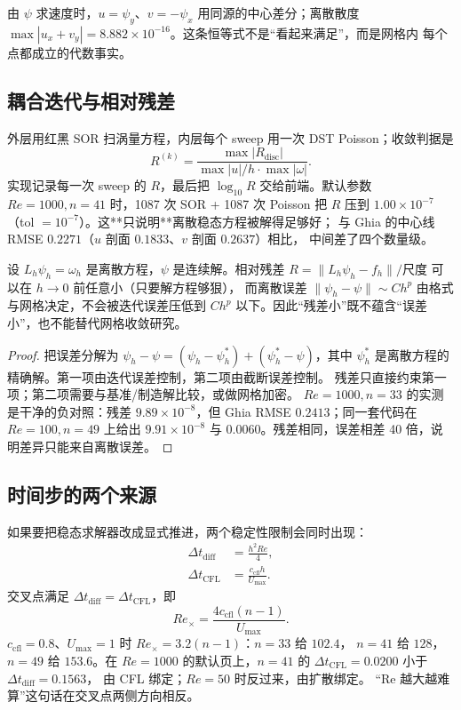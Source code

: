 由 $\psi$ 求速度时，$u=\psi_y$、$v=-\psi_x$ 用同源的中心差分；离散散度
$\max|u_x+v_y|=8.882\times10^{-16}$。这条恒等式不是“看起来满足”，而是网格内
每个点都成立的代数事实。

\subsection{耦合迭代与相对残差}

外层用红黑 SOR 扫涡量方程，内层每个 sweep 用一次 DST Poisson；收敛判据是
\[
  R^{(k)}=\frac{\max|R_{\text{disc}}|}
  {\max|u|/h\cdot\max|\omega|}.
\]
实现记录每一次 sweep 的 $R$，最后把 $\log_{10}R$ 交给前端。默认参数
$Re=1000,n=41$ 时，1087 次 SOR + 1087 次 Poisson 把 $R$ 压到
$1.00\times10^{-7}$（tol $=10^{-7}$）。这**只说明**离散稳态方程被解得足够好；
与 Ghia 的中心线 RMSE $0.2271$（$u$ 剖面 $0.1833$、$v$ 剖面 $0.2637$）相比，
中间差了四个数量级。

\begin{theorem}[残差与误差是两件事]\label{thm:residual}
设 $L_h\psi_h=\omega_h$ 是离散方程，$\psi$ 是连续解。相对残差
$R=\|L_h\psi_h-f_h\|/\text{尺度}$ 可以在 $h\to0$ 前任意小（只要解方程够狠），
而离散误差 $\|\psi_h-\psi\|\sim C h^p$ 由格式与网格决定，不会被迭代误差压低到
$Ch^p$ 以下。因此“残差小”既不蕴含“误差小”，也不能替代网格收敛研究。
\end{theorem}

\begin{proof}
把误差分解为 $\psi_h-\psi=(\psi_h-\psi_h^\ast)+(\psi_h^\ast-\psi)$，其中
$\psi_h^\ast$ 是离散方程的精确解。第一项由迭代误差控制，第二项由截断误差控制。
残差只直接约束第一项；第二项需要与基准/制造解比较，或做网格加密。
$Re=1000,n=33$ 的实测是干净的负对照：残差 $9.89\times10^{-8}$，但
Ghia RMSE $0.2413$；同一套代码在 $Re=100,n=49$ 上给出 $9.91\times10^{-8}$ 与
$0.0060$。残差相同，误差相差 40 倍，说明差异只能来自离散误差。
\end{proof}

\subsection{时间步的两个来源}

如果要把稳态求解器改成显式推进，两个稳定性限制会同时出现：
\begin{align}
  \Delta t_{\text{diff}}&=\frac{h^2Re}{4},\\
  \Delta t_{\text{CFL}}&=\frac{c_{\text{cfl}}h}{U_{\max}}.
\end{align}
交叉点满足 $\Delta t_{\text{diff}}=\Delta t_{\text{CFL}}$，即
\[
  Re_\times=\frac{4c_{\text{cfl}}(n-1)}{U_{\max}}.
\]
$c_{\text{cfl}}=0.8$、$U_{\max}=1$ 时 $Re_\times=3.2(n-1)$：$n=33$ 给 $102.4$，
$n=41$ 给 $128$，$n=49$ 给 $153.6$。在 $Re=1000$ 的默认页上，$n=41$ 的
$\Delta t_{\text{CFL}}=0.0200$ 小于 $\Delta t_{\text{diff}}=0.1563$，
由 CFL 绑定；$Re=50$ 时反过来，由扩散绑定。
“Re 越大越难算”这句话在交叉点两侧方向相反。

